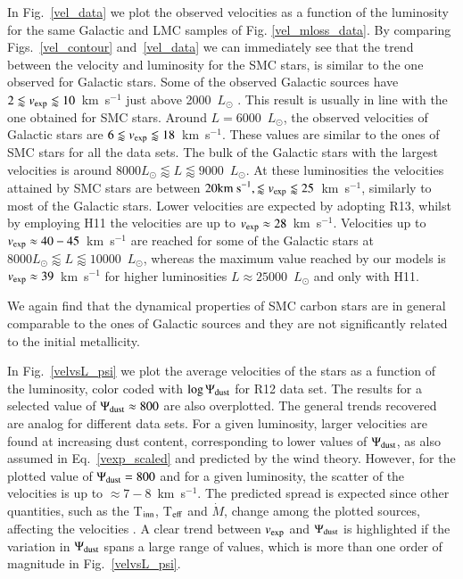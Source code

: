 \documentclass[useAMS,usenatbib]{mn2e/mn2e}
\begin{document}
{In Fig.~\ref{vel_data} we plot the observed velocities as a function of the luminosity for the same Galactic and LMC samples of Fig. \ref{vel_mloss_data}.
By comparing Figs.~\ref{vel_contour} and~\ref{vel_data} we can immediately see that the trend between the velocity and luminosity for the SMC stars, is similar to the one observed for Galactic stars. 
Some of the observed Galactic sources have $2\lessapprox v_{\rm exp}\lessapprox10$~km~s$^{-1}$ just above 2000~$L_{\odot}$ \citep{Schoier01}. This result is usually in line with the one obtained for SMC stars.
Around $L=6000$~$L_\odot$, the observed velocities of Galactic stars are $6\lessapprox v_{\rm exp}\lessapprox18$~km~s$^{-1}$. These values are similar to the ones of SMC stars for all the data sets.
The bulk of the Galactic stars with the largest velocities is around $8000 L_{\odot} \lessapprox L \lessapprox9000$~$L_{\odot}$. At these luminosities the velocities attained by SMC stars are between $20 {\rm km~s}^{-1},\lessapprox v_{\rm exp}\lessapprox25$~km~s$^{-1}$, similarly to most of the Galactic stars. Lower velocities are expected by adopting R13, whilst by employing H11 the velocities are up to $v_{\rm exp}\approx28$~km~s$^{-1}$.
Velocities up to $v_{\rm exp}\approx40-45$~km~s$^{-1}$ are reached for some of the Galactic stars at $8000 L_{\odot} \lessapprox L\lessapprox10000$~$L_{\odot}$, whereas the maximum value reached by our models is $v_{\rm exp}\approx39$~km~s$^{-1}$ for higher luminosities $L\approx25000$~$L_{\odot}$ and only with H11. 

We again find that the dynamical properties of SMC carbon stars are in general comparable to the ones of Galactic sources and they are not significantly related to the initial metallicity.

In Fig.~\ref{velvsL_psi} we plot the average velocities of the stars as a function of the luminosity, color coded with $\log\Psi_{\rm dust}$ for R12 data set. 
The results for a selected value of $\Psi_{\rm dust}\approx 800$ are also overplotted.
The general trends recovered are analog for different data sets.
For a given luminosity, larger velocities are found at increasing dust content, corresponding to lower values of $\Psi_{\rm dust}$, as also assumed in Eq.~\ref{vexp_scaled} and predicted by the wind theory.
However, for the plotted value of $\Psi_{\rm dust}=800$ and for a given luminosity, the scatter of the velocities is up to $\approx7-8$~km~s$^{-1}$. 
The predicted spread is expected since other quantities, such as the T$_{\rm inn}$, T$_{\rm eff}$ and $\dot{M}$, change among the plotted sources, affecting the velocities \citep{Elitzur01, Ivezic10}.
A clear trend between $v_{\rm exp}$ and $\Psi_{\rm dust}$ is highlighted if the variation in $\Psi_{\rm dust}$ spans a large range of values, which is more than one order of magnitude in Fig.~\ref{velvsL_psi}.

}
\end{document}
